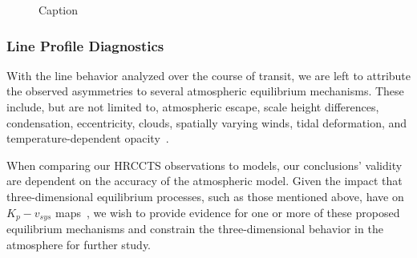 \documentclass[twocolumn]{aastex631}
\begin{document}
            \begin{figure}
                \caption{Caption}
                \label{fig:line-profile-asymmetries}
            \end{figure}
                
            \subsubsection{Line Profile Diagnostics}\label{subsubsec:Wind Profile Diagnostics}
                With the line behavior analyzed over the course of transit, we are left to attribute the observed asymmetries to several atmospheric equilibrium mechanisms. These include, but are not limited to, atmospheric escape, scale height differences, condensation, eccentricity, clouds, spatially varying winds, tidal deformation, and temperature-dependent opacity~\citep{Savel2023}. 

                When comparing our HRCCTS observations to models, our conclusions' validity are dependent on the accuracy of the atmospheric model. Given the impact that three-dimensional equilibrium processes, such as those mentioned above, have on $K_p-v_{sys}$ maps~\citep{Wardenier2021}, we wish to provide evidence for one or more of these proposed equilibrium mechanisms and constrain the three-dimensional behavior in the atmosphere for further study.
\end{document}
